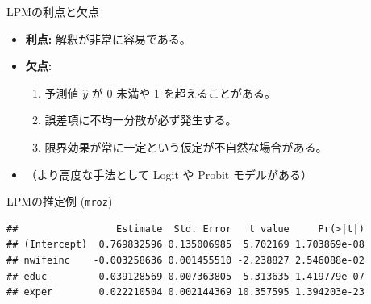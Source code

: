 \documentclass[
  ignorenonframetext,
]{beamer}
\newenvironment{Shaded}{\begin{snugshade}}{\end{snugshade}}
\newcommand{\AttributeTok}[1]{\textcolor[rgb]{0.77,0.63,0.00}{#1}}
\newcommand{\CommentTok}[1]{\textcolor[rgb]{0.56,0.35,0.01}{\textit{#1}}}
\newcommand{\DecValTok}[1]{\textcolor[rgb]{0.00,0.00,0.81}{#1}}
\newcommand{\FunctionTok}[1]{\textcolor[rgb]{0.00,0.00,0.00}{#1}}
\newcommand{\NormalTok}[1]{#1}
\newcommand{\OtherTok}[1]{\textcolor[rgb]{0.56,0.35,0.01}{#1}}
\newcommand{\SpecialCharTok}[1]{\textcolor[rgb]{0.00,0.00,0.00}{#1}}
\providecommand{\tightlist}{%
  \setlength{\itemsep}{0pt}\setlength{\parskip}{0pt}}
\begin{document}
\begin{frame}{LPMの利点と欠点}
\protect\hypertarget{lpmux306eux5229ux70b9ux3068ux6b20ux70b9}{}
\begin{itemize}
\tightlist
\item
  \textbf{利点:} 解釈が非常に容易である。
\item
  \textbf{欠点:}

  \begin{enumerate}
  \tightlist
  \item
    予測値 \(\hat{y}\) が 0 未満や 1 を超えることがある。
  \item
    誤差項に不均一分散が必ず発生する。
  \item
    限界効果が常に一定という仮定が不自然な場合がある。
  \end{enumerate}
\item
  （より高度な手法として Logit や Probit モデルがある）
\end{itemize}
\end{frame}

\begin{frame}[fragile]{LPMの推定例 (\texttt{mroz})}
\protect\hypertarget{lpmux306eux63a8ux5b9aux4f8b-mroz}{}
\footnotesize

\begin{Shaded}
\end{Shaded}

\begin{verbatim}
##                 Estimate  Std. Error   t value     Pr(>|t|)
## (Intercept)  0.769832596 0.135006985  5.702169 1.703869e-08
## nwifeinc    -0.003258636 0.001455510 -2.238827 2.546088e-02
## educ         0.039128569 0.007363805  5.313635 1.419779e-07
## exper        0.022210504 0.002144369 10.357595 1.394203e-23
\end{verbatim}

\normalsize
\end{frame}
\end{document}
